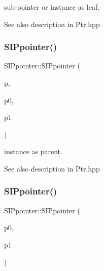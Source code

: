 sub-\/pointer or instance as leaf. 

\begin{DoxySeeAlso}{See also}
description in Ptr.\+hpp 
\end{DoxySeeAlso}
\mbox{\label{group__table_gaa4c3c43c081bf789120e96683bc70cb3}} 
\subsubsection{\texorpdfstring{SIPpointer()}{SIPpointer()}\hspace{0.1cm}{\footnotesize\ttfamily [6/7]}}
{\footnotesize\ttfamily S\+I\+Ppointer\+::\+S\+I\+Ppointer (\begin{DoxyParamCaption}\item[{const \mbox{\hyperlink{classSIPpointer}{S\+I\+Ppointer}} \&}]{p,  }\item[{const \mbox{\hyperlink{classSIPpointer}{S\+I\+Ppointer}} \&}]{p0,  }\item[{const \mbox{\hyperlink{classSIPpointer}{S\+I\+Ppointer}} \&}]{p1 }\end{DoxyParamCaption})}



instance as parent. 

\begin{DoxySeeAlso}{See also}
description in Ptr.\+hpp 
\end{DoxySeeAlso}
\mbox{\label{group__table_ga12c22407821e96d6c7d0bca88392cbda}} 
\subsubsection{\texorpdfstring{SIPpointer()}{SIPpointer()}\hspace{0.1cm}{\footnotesize\ttfamily [7/7]}}
{\footnotesize\ttfamily S\+I\+Ppointer\+::\+S\+I\+Ppointer (\begin{DoxyParamCaption}\item[{const \mbox{\hyperlink{classSIPpointer}{S\+I\+Ppointer}} \&}]{p0,  }\item[{const \mbox{\hyperlink{classSIPpointer}{S\+I\+Ppointer}} \&}]{p1 }\end{DoxyParamCaption})}




